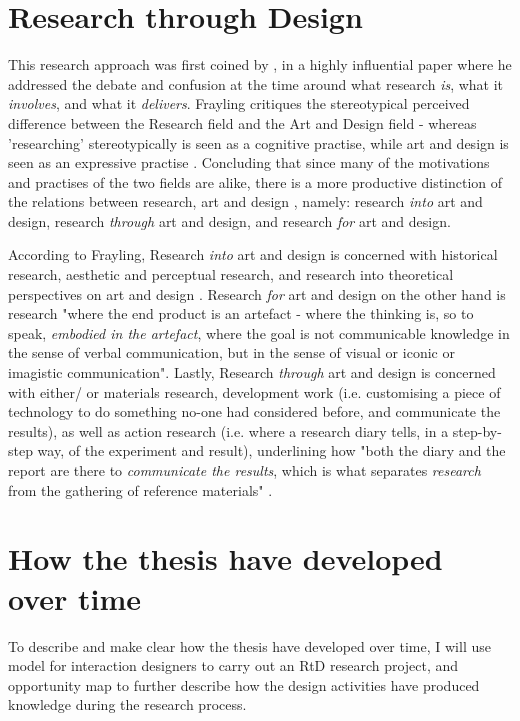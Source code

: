 
\section{Research through Design}
This research approach was first coined by \autocite{frayling_1994}, in a highly influential paper where he addressed the debate and confusion at the time around what research \emph{is}, what it \emph{involves}, and what it \emph{delivers}. Frayling critiques the stereotypical perceived difference between the Research field and the Art and Design field - whereas 'researching' stereotypically is seen as a cognitive practise, while art and design is seen as an expressive practise \autocite[p. 5]{frayling_1994}. Concluding that since many of the motivations and practises of the two fields are alike, there is a more productive distinction of the relations between research, art and design \autocite[p. 5]{frayling_1994}, namely: research \emph{into} art and design, research \emph{through} art and design, and research \emph{for} art and design.

According to Frayling, Research \emph{into} art and design is concerned with historical research, aesthetic and perceptual research, and research into theoretical perspectives on art and design \autocite[p. 5]{frayling_1994}. Research \emph{for} art and design on the other hand is research "where the end product is an artefact - where the thinking is, so to speak, \emph{embodied in the artefact}, where the goal is not communicable knowledge in the sense of verbal communication, but in the sense of visual or iconic or imagistic communication"\autocite[p. 5]{frayling_1994}. Lastly, Research \emph{through} art and design is concerned with either/ or materials research, development work (i.e. customising a piece of technology to do something no-one had considered before, and communicate the results), as well as action research (i.e. where a research diary tells, in a step-by-step way, of the experiment and result), underlining how "both the diary and the report are there to \emph{communicate the results}, which is what separates \emph{research} from the gathering of reference materials" \autocite[p. 5]{frayling_1994}.
\par




\section{How the thesis have developed over time}
To describe and make clear how the thesis have developed over time, I will use \autocite{zimmerman_research_2014} model for interaction designers to carry out an RtD research project, and \autocite[]{zimmerman_discovering_2004} opportunity map to further describe how the design activities have produced knowledge during the research process.

